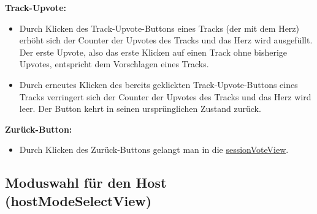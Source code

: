 \documentclass[oneside, ngerman]{sdqtechreport}
\begin{document}
\textbf{Track-Upvote:}
\begin{itemize}
    \item Durch Klicken des Track-Upvote-Buttons eines Tracks (der mit dem Herz) erhöht sich der Counter der Upvotes des Tracks und das Herz wird ausgefüllt. Der erste Upvote, also das erste Klicken auf einen Track ohne bisherige Upvotes, entspricht dem Vorschlagen eines Tracks.
    \item Durch erneutes Klicken des bereits geklickten Track-Upvote-Buttons eines Tracks verringert sich der Counter der Upvotes des Tracks und das Herz wird leer. Der Button kehrt in seinen ursprünglichen Zustand zurück.
\end{itemize}

\textbf{Zurück-Button:}
\begin{itemize}
    \item Durch Klicken des Zurück-Buttons gelangt man in die  \hyperlink{sessionVoteView}{sessionVoteView}.
\end{itemize}

\newpage

\subsection{Moduswahl für den Host (hostModeSelectView)}
\label{sec:Benutzeroberfläche:joinSessionView}
\end{document}
